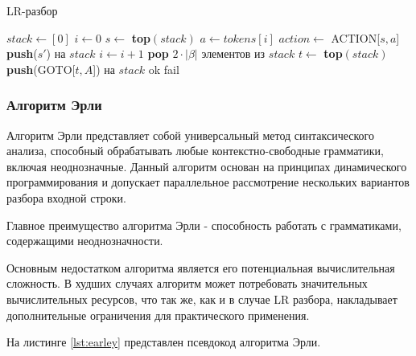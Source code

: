 \documentclass[14pt, russian]{scrartcl}
\begin{document}
\begin{listing}[H]
	\caption{LR-разбор}
	\label{lst:lr}
\begin{algorithm}[H]
	\begin{algorithmic}[1]
	  \State $stack \gets [0]$
	  \State $i \gets 0$
		\State $s \gets$ \textbf{top}$(stack)$
		\State $a \gets tokens[i]$
		\State $action \gets$ ACTION[$s, a$]
		  \State \textbf{push}($s'$) на $stack$
		  \State $i \gets i + 1$
		  \State \textbf{pop} $2\cdot |\beta|$ элементов из $stack$
		  \State $t \gets$ \textbf{top}$(stack)$
		  \State \textbf{push}(GOTO[$t, A$]) на $stack$
		  \State \Return ok
		\Else
		  \State \Return fail
		\EndIf
	  \EndWhile
	\EndProcedure
	\end{algorithmic}
	\end{algorithm}
\end{listing}

\subsubsection{Алгоритм Эрли}

\label{sec:earleyint}

Алгоритм Эрли представляет собой универсальный метод синтаксического анализа, способный обрабатывать любые
контекстно-свободные грамматики, включая неоднозначные. Данный алгоритм основан на принципах динамического
программирования и допускает параллельное рассмотрение нескольких вариантов разбора входной строки.

Главное преимущество алгоритма Эрли - способность работать с грамматиками, содержащими неоднозначности.

Основным недостатком алгоритма является его потенциальная вычислительная сложность. В худших случаях алгоритм
может потребовать значительных вычислительных ресурсов, что так же, как и в случае LR разбора, накладывает
дополнительные ограничения для практического применения.


На листинге \ref{lst:earley} представлен псевдокод алгоритма Эрли.
\end{document}
